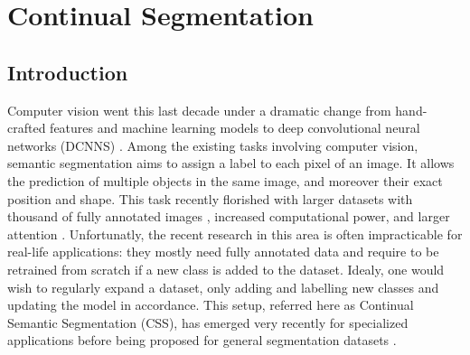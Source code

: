 \chapter{Continual Segmentation}
\label{chapter:segmentation}

{}



\section{Introduction}


Computer vision went this last decade under a dramatic change from hand-crafted features
\citep{lowe1999sift,perronnin2007fisherkernels} and machine learning models \citep{cortes1995svm} to
deep convolutional neural networks (DCNNS) \citep{krizhevsky2012alexnet}. Among the existing tasks
involving computer vision, semantic segmentation aims to assign a label to each pixel of an image.
It allows the prediction of multiple objects in the same image, and moreover their exact position
and shape. This task recently florished \citep{tao2020HRNet,zhang2020resnest,chen2018ZPSA} with
larger datasets with thousand of fully annotated images
\citep{zhou2017adedataset,neuhold2017mapillary}, increased computational power, and larger attention
\citep{wang2020axialdeeplab}. Unfortunatly, the recent research in this area is often impracticable
for real-life applications: they mostly need fully annotated data and require to be retrained from
scratch if a new class is added to the dataset. Idealy, one would wish to regularly expand a
dataset, only adding and labelling new classes and updating the model in accordance. This setup,
referred here as Continual Semantic Segmentation (CSS), has emerged very recently for specialized
applications
\citep{ozdemir2018learnthenewkeeptheold,ozdemir2019segmentationanotomical,tasar19incrementsegmentationremotesensing}
before being proposed for general segmentation datasets
\citep{michieli2019ilt,cermelli2020modelingthebackground,douillard2020plop}.

